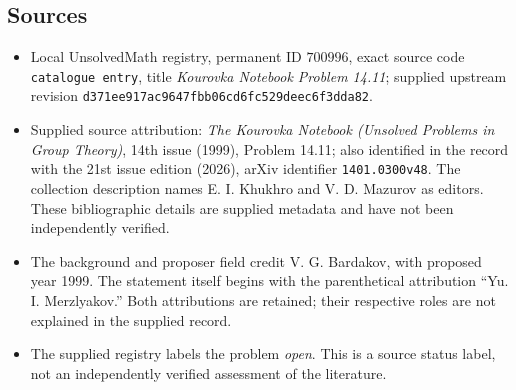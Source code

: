 \documentclass[11pt]{article}
\begin{document}
\subsection{Sources}
\begin{itemize}
\item Local UnsolvedMath registry, permanent ID \(700996\), exact source code \texttt{catalogue entry}, title \emph{Kourovka Notebook Problem 14.11}; supplied upstream revision \texttt{d371ee917ac9647fbb06cd6fc529deec6f3dda82}.
\item Supplied source attribution: \emph{The Kourovka Notebook (Unsolved Problems in Group Theory)}, 14th issue (1999), Problem 14.11; also identified in the record with the 21st issue edition (2026), arXiv identifier \texttt{1401.0300v48}. The collection description names E. I. Khukhro and V. D. Mazurov as editors. These bibliographic details are supplied metadata and have not been independently verified.
\item The background and proposer field credit V. G. Bardakov, with proposed year 1999. The statement itself begins with the parenthetical attribution ``Yu. I. Merzlyakov.'' Both attributions are retained; their respective roles are not explained in the supplied record.
\item The supplied registry labels the problem \emph{open}. This is a source status label, not an independently verified assessment of the literature.
\end{itemize}
\end{document}
